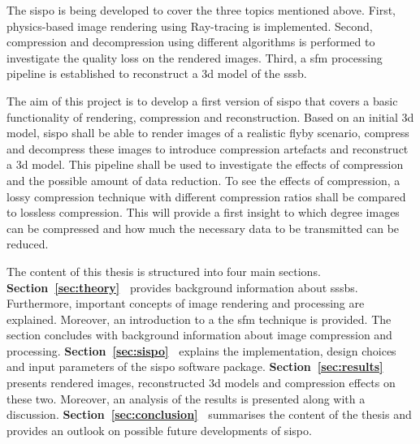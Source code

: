 
The \gls{sispo} is being developed to cover the three topics mentioned above. First, physics-based image rendering using Ray-tracing is implemented. Second, compression and decompression using different algorithms is performed to investigate the quality loss on the rendered images. Third, a \gls{sfm} processing pipeline is established to reconstruct a \gls{3d} model of the \gls{sssb}.

The aim of this project is to develop a first version of \gls{sispo} that covers a basic functionality of rendering, compression and reconstruction. Based on an initial \gls{3d} model, \gls{sispo} shall be able to render images of a realistic flyby scenario, compress and decompress these images to introduce compression artefacts and reconstruct a \gls{3d} model. This pipeline shall be used to investigate the effects of compression and the possible amount of data reduction. To see the effects of compression, a lossy compression technique with different compression ratios shall be compared to lossless compression. This will provide a first insight to which degree images can be compressed and how much the necessary data to be transmitted can be reduced.

The content of this thesis is structured into four main sections. \newline
\textbf{Section~\ref{sec:theory}~} provides background information about \glspl{sssb}. Furthermore, important concepts of image rendering and processing are explained. Moreover, an introduction to a the \gls{sfm} technique is provided. The section concludes with background information about image compression and processing. \newline
\textbf{Section~\ref{sec:sispo}~} explains the implementation, design choices and input parameters of the \gls{sispo} software package. \newline
\textbf{Section~\ref{sec:results}~} presents rendered images, reconstructed \gls{3d} models and compression effects on these two. Moreover, an analysis of the results is presented along with a discussion. \newline
\textbf{Section~\ref{sec:conclusion}~} summarises the content of the thesis and provides an outlook on possible future developments of \gls{sispo}.

